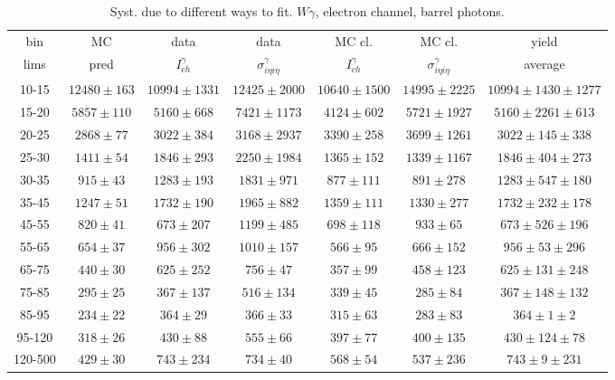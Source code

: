 \begin{table}[h]
  \tiny
  \begin{center}
  \caption{Syst. due to different ways to fit. $W\gamma$, electron channel, barrel photons.}
  \begin{tabular}{|c|c|c|c|c|c|c|}
    bin &  MC   & data  & data  & MC cl. & MC cl. & yield \\ 
    lims & pred & $I_{ch}^{\gamma}$ & $\sigma_{i\eta i\eta}^\gamma$  & $I_{ch}^{\gamma}$  & $\sigma_{i\eta i\eta}^\gamma$   & average \\ \hline
    10-15 & $12480\pm163$ & $10994\pm1331$ & $12425\pm2000$ & $10640\pm1500$ & $14995\pm2225$ &$10994\pm1430\pm1277$  \\ \hline
    15-20 & $5857\pm110$ & $5160\pm668$ & $7421\pm1173$ & $4124\pm602$ & $5721\pm1927$ &$5160\pm2261\pm613$  \\ \hline
    20-25 & $2868\pm77$ & $3022\pm384$ & $3168\pm2937$ & $3390\pm258$ & $3699\pm1261$ &$3022\pm145\pm338$  \\ \hline
    25-30 & $1411\pm54$ & $1846\pm293$ & $2250\pm1984$ & $1365\pm152$ & $1339\pm1167$ &$1846\pm404\pm273$  \\ \hline
    30-35 & $915\pm43$ & $1283\pm193$ & $1831\pm971$ & $877\pm111$ & $891\pm278$ &$1283\pm547\pm180$  \\ \hline
    35-45 & $1247\pm51$ & $1732\pm190$ & $1965\pm882$ & $1359\pm111$ & $1330\pm277$ &$1732\pm232\pm178$  \\ \hline
    45-55 & $820\pm41$ & $673\pm207$ & $1199\pm485$ & $698\pm118$ & $933\pm65$ &$673\pm526\pm196$  \\ \hline
    55-65 & $654\pm37$ & $956\pm302$ & $1010\pm157$ & $566\pm95$ & $666\pm152$ &$956\pm53\pm296$  \\ \hline
    65-75 & $440\pm30$ & $625\pm252$ & $756\pm47$ & $357\pm99$ & $458\pm123$ &$625\pm131\pm248$  \\ \hline
    75-85 & $295\pm25$ & $367\pm137$ & $516\pm134$ & $339\pm45$ & $285\pm84$ &$367\pm148\pm132$  \\ \hline
    85-95 & $234\pm22$ & $364\pm29$ & $366\pm33$ & $315\pm63$ & $283\pm83$ &$364\pm1\pm2$  \\ \hline
    95-120 & $318\pm26$ & $430\pm88$ & $555\pm66$ & $397\pm77$ & $400\pm135$ &$430\pm124\pm78$  \\ \hline
    120-500 & $429\pm30$ & $743\pm234$ & $734\pm40$ & $568\pm54$ & $537\pm236$ &$743\pm9\pm231$  \\ \hline
  \end{tabular}
  \label{tab:diff_ways_to_fit_phoEt_BARREL_electron}
  \end{center}
\end{table}

